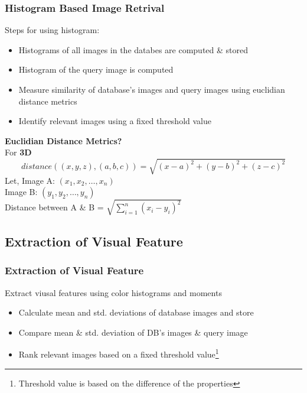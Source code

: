 \documentclass[15pt]{beamer}
\begin{document}
\begin{frame}
\frametitle{Histogram Based Image Retrival}
Steps for using histogram:\\
\pause
\begin{itemize}[label=$\blacksquare$]
\setlength\itemsep{1.2em}

\item Histograms of all images in the databes are computed \& stored
\pause
\item Histogram of the query image is computed
\pause
\item Measure similarity of database's images and query images using euclidian distance metrics
\pause
\item Identify relevant images using a fixed threshold value\\[\baselineskip]
\end{itemize}
\pause
\textbf{Euclidian Distance Metrics?}\\[\baselineskip]
\pause
For \textbf{3D}
\begin{equation}
distance((x,y,z),(a,b,c)) = \sqrt{(x-a)^2+(y-b)^2+(z-c)^2}
\end{equation}
\pause
Let,
Image A: $(x_1, x_2,\ldots,x_n)$\\
Image B: $(y_1, y_2,\ldots,y_n)$\\[\baselineskip]
\pause
Distance between A \& B = $\sqrt{\sum_{i=1}^{n}(x_i-y_i)^2}$
\end{frame}

\subsection{Extraction of Visual Feature}
\begin{frame}
\frametitle{Extraction of Visual Feature}
\pause
Extract viusal features using color histograms and moments \\[\baselineskip]
\pause
\begin{itemize}[label=$\blacksquare$]
\setlength\itemsep{1.5em}

\item Calculate mean and std. deviations of database images and store
\pause
\item Compare mean \& std. deviation of DB's images \& query image
\pause
\item Rank relevant images based on a fixed threshold value\footnote{Threshold value is based on the difference of the properties}\\[\baselineskip]
\end{itemize}
\end{frame}
\end{document}
